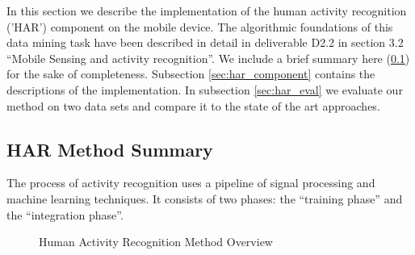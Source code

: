 \label{sec:HAR}

\newcommand{\IR}{\mathbb{R}}

In this section we describe the implementation of the human activity
recognition ('HAR') component on the mobile device.  The algorithmic
foundations of this data mining task have been described in detail in
deliverable D2.2 in section 3.2 ``Mobile Sensing and activity
recognition''. We include a brief summary here (\ref{sec:har_method})
for the sake of completeness. Subsection \ref{sec:har_component}
contains the descriptions of the implementation. In subsection
\ref{sec:har_eval} we evaluate our method on two data sets and compare
it to the state of the art approaches.

\subsection{HAR Method Summary}\label{sec:har_method}

The process of activity recognition uses a pipeline of signal
processing and machine learning techniques. It consists of two phases:
the ``training phase'' and the ``integration phase''. 

\begin{figure}[htbp]
\centering
{} \hspace{1cm}
\caption{Human Activity Recognition Method Overview}
\label{fig:HAR_PHASES}
\end{figure}

